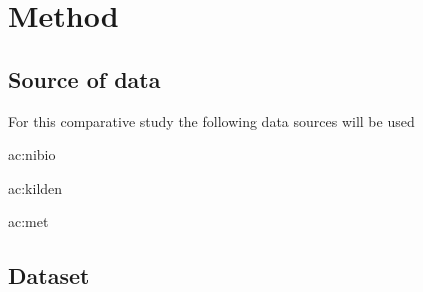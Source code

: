 \section{Method}

\subsection{Source of data}

For this comparative study the following data sources will be used

\begin{enumerate*}
	\item \acrfull{ac:nibio}
	\item \acrfull{ac:kilden}
	\item \acrfull{ac:met}
\end{enumerate*}

\subsection{Dataset}

